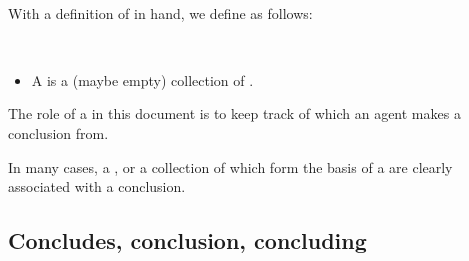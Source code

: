 



\paragraph*{}


\begin{note}
  With a definition of  in hand, we define  as follows:

  \begin{definition}[\pool{3}]
    \label{def:pools}
    \mbox{ }
    \vspace{-\baselineskip}
    \begin{itemize}
    \item
      A \emph{\pool{}} is a (maybe empty) collection of .
    \end{itemize}
    \vspace{-\baselineskip}
  \end{definition}

  \noindent%
  The role of a \pool{} in this document is to keep track of which  an agent makes a conclusion from.

  In many cases, a \pool{}, or a collection of \evalN{} which form the basis of a \pool{} are clearly associated with a conclusion.
\end{note}



\subsection{Concludes, conclusion, concluding}
\label{sec:concl-events-which}


